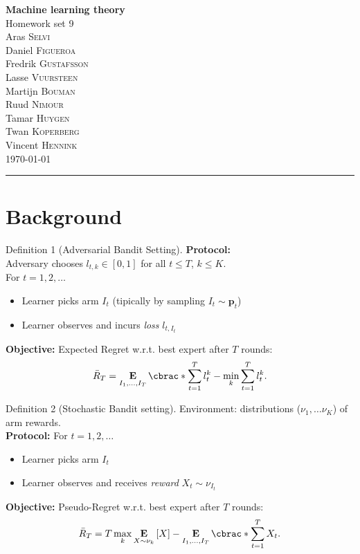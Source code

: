 \documentclass[10pt, a4paper, twoside]{amsart}
\theoremstyle{plain}
\DeclarePairedDelimiter\cbrac\{\}
\newcommand{\Ev}{\operatorname*{\ensuremath{\mathbf{E}}}} %
\begin{document}
\begin{center}
    {\huge\bf Machine learning theory}\\
    {\large\sc Homework set 9 }\\ \vspace{1em}
    {Aras} \textsc{ {Selvi}} \\
    {Daniel} \textsc{ {Figueroa}}\\
    {Fredrik} \textsc{ {Gustafsson}}\\
    {Lasse} \textsc{ {Vuursteen}}\\
    {Martijn} \textsc{ {Bouman}}\\
    {Ruud} \textsc{ {Nimour}}\\
    {Tamar} \textsc{ {Huygen}}\\
    {Twan} \textsc{ {Koperberg}}\\
    {Vincent} \textsc{ {Hennink}}\\ 
    \bigskip
    \today \bigskip
    \hrule
    \bigskip
\end{center}

\section{Background}
\begin{definitionbox}{Definition 1 (Adversarial Bandit Setting).}
  \textbf{Protocol:}\\
  Adversary chooses $l_{t,k} \in [0,1]$ for all $t \leq T$, $k \leq K$.\\
  For $t = 1,2, \ldots$
\begin{itemize}
    \item Learner picks arm $I_t$ (tipically by sampling $I_t \sim \mathbf{p}_t$)
    \item Learner observes and incurs \textit{loss} $l_{t, I_{t}}$
\end{itemize}
\textbf{Objective:} Expected Regret w.r.t. best expert after $T$ rounds:
\begin{equation*}
    \bar{R}_T = \Ev_{I_1 , \ldots , I_T} \cbrac*{\sum^T_{t=1} l_t^k} - \min_k \sum_{t=1}^T l_t^k .
\end{equation*}
\end{definitionbox}
\begin{definitionbox}{Definition 2 (Stochastic Bandit setting).}
  Environment: distributions ($\nu_1 , \ldots \nu_K$) of arm rewards.\\
\textbf{Protocol:} For $t = 1,2, \ldots$
\begin{itemize}
    \item Learner picks arm $I_t$
    \item Learner observes and receives \textit{reward} $X_t \sim \nu_{I_t}$
\end{itemize}
\textbf{Objective:} Pseudo-Regret w.r.t. best expert after $T$ rounds:
\begin{equation*}
    \bar{R}_T = T \max_{k} \Ev_{X \sim \nu_k} \left[ X \right] - \Ev_{I_1 , \ldots , I_T} \cbrac*{ \sum^T_{t=1} X_t} .
\end{equation*}
\end{definitionbox}
\end{document}
